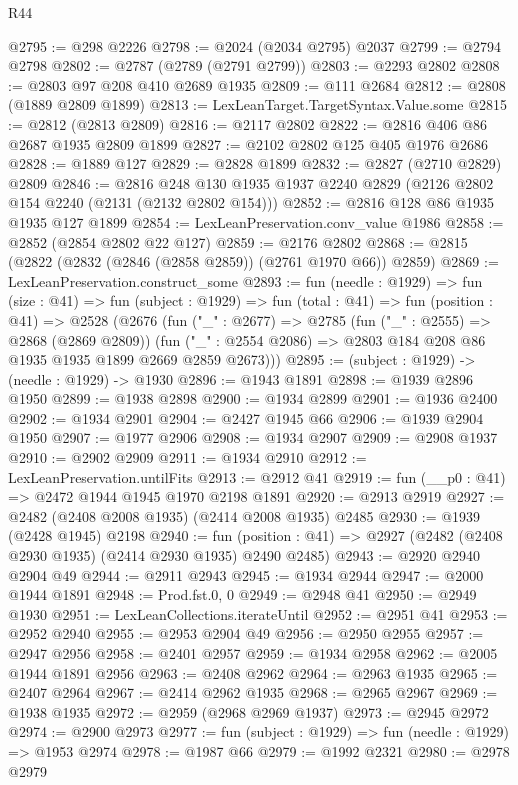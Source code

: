 \begin{lexlean}{R44}
\begin{coremodule}
@2795 := @298 @2226
@2798 := @2024 (@2034 @2795) @2037
@2799 := @2794 @2798
@2802 := @2787 (@2789 (@2791 @2799))
@2803 := @2293 @2802
@2808 := @2803 @97 @208 @410 @2689 @1935
@2809 := @111 @2684
@2812 := @2808 (@1889 @2809 @1899)
@2813 := LexLeanTarget.TargetSyntax.Value.some
@2815 := @2812 (@2813 @2809)
@2816 := @2117 @2802
@2822 := @2816 @406 @86 @2687 @1935 @2809 @1899
@2827 := @2102 @2802 @125 @405 @1976 @2686
@2828 := @1889 @127
@2829 := @2828 @1899
@2832 := @2827 (@2710 @2829) @2809
@2846 := @2816 @248 @130 @1935 @1937 @2240 @2829 (@2126 @2802 @154 @2240 (@2131 (@2132 @2802 @154)))
@2852 := @2816 @128 @86 @1935 @1935 @127 @1899
@2854 := LexLeanPreservation.conv_value @1986
@2858 := @2852 (@2854 @2802 @22 @127)
@2859 := @2176 @2802
@2868 := @2815 (@2822 (@2832 (@2846 (@2858 @2859)) (@2761 @1970 @66)) @2859)
@2869 := LexLeanPreservation.construct_some
@2893 := fun (needle : @1929) =>
  fun (size : @41) =>
  fun (subject : @1929) =>
  fun (total : @41) =>
  fun (position : @41) =>
  @2528
    (@2676
      (fun ("_" : @2677) =>
      @2785
        (fun ("_" : @2555) => @2868 (@2869 @2809))
        (fun ("_" : @2554 @2086) => @2803 @184 @208 @86 @1935 @1935 @1899 @2669 @2859 @2673)))
@2895 := (subject : @1929) -> (needle : @1929) -> @1930
@2896 := @1943 @1891
@2898 := @1939 @2896 @1950
@2899 := @1938 @2898
@2900 := @1934 @2899
@2901 := @1936 @2400
@2902 := @1934 @2901
@2904 := @2427 @1945 @66
@2906 := @1939 @2904 @1950
@2907 := @1977 @2906
@2908 := @1934 @2907
@2909 := @2908 @1937
@2910 := @2902 @2909
@2911 := @1934 @2910
@2912 := LexLeanPreservation.untilFits
@2913 := @2912 @41
@2919 := fun (__p0 : @41) => @2472 @1944 @1945 @1970 @2198 @1891
@2920 := @2913 @2919
@2927 := @2482 (@2408 @2008 @1935) (@2414 @2008 @1935) @2485
@2930 := @1939 (@2428 @1945) @2198
@2940 := fun (position : @41) => @2927 (@2482 (@2408 @2930 @1935) (@2414 @2930 @1935) @2490 @2485)
@2943 := @2920 @2940 @2904 @49
@2944 := @2911 @2943
@2945 := @1934 @2944
@2947 := @2000 @1944 @1891
@2948 := Prod.fst.{0, 0}
@2949 := @2948 @41
@2950 := @2949 @1930
@2951 := LexLeanCollections.iterateUntil
@2952 := @2951 @41
@2953 := @2952 @2940
@2955 := @2953 @2904 @49
@2956 := @2950 @2955
@2957 := @2947 @2956
@2958 := @2401 @2957
@2959 := @1934 @2958
@2962 := @2005 @1944 @1891 @2956
@2963 := @2408 @2962
@2964 := @2963 @1935
@2965 := @2407 @2964
@2967 := @2414 @2962 @1935
@2968 := @2965 @2967
@2969 := @1938 @1935
@2972 := @2959 (@2968 @2969 @1937)
@2973 := @2945 @2972
@2974 := @2900 @2973
@2977 := fun (subject : @1929) => fun (needle : @1929) => @1953 @2974
@2978 := @1987 @66
@2979 := @1992 @2321
@2980 := @2978 @2979

\end{coremodule}
\end{lexlean}
